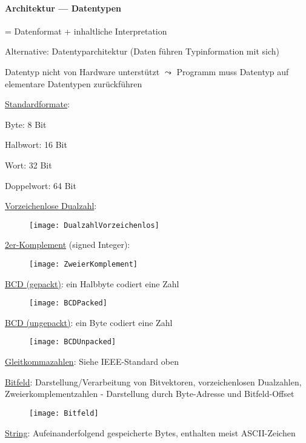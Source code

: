 \paragraph{Architektur --- Datentypen}
\begin{items}
	\item = Datenformat + inhaltliche Interpretation
	\item Alternative: Datentyparchitektur (Daten führen Typinformation mit sich)
	\item Datentyp nicht von Hardware unterstützt $\leadsto$ Programm muss Datentyp auf elementare Datentypen zurückführen
	\item \underline{Standardformate}:
	\begin{enumeration}
		\item Byte: 8 Bit
		\item Halbwort: 16 Bit
		\item Wort: 32 Bit
		\item Doppelwort: 64 Bit
	\end{enumeration}
	\item \underline{Vorzeichenlose Dualzahl}:
	\begin{figure}[H]
	  \centering
	  \texttt{[image: DualzahlVorzeichenlos]}
	  \label{DualzahlVorzeichenlos}
	\end{figure}
	\item \underline{2er-Komplement} (signed Integer):
	\begin{figure}[H]
	  \centering
	  \texttt{[image: ZweierKomplement]}
	  \label{ZweierKomplement}
	\end{figure}
	\newpage
	\item \underline{BCD (gepackt)}: ein Halbbyte codiert eine Zahl
	\begin{figure}[H]
	  \centering
	  \texttt{[image: BCDPacked]}
	  \label{BCDPacked}
	\end{figure}
	\item \underline{BCD (ungepackt)}: ein Byte codiert eine Zahl
	\begin{figure}[H]
	  \centering
	  \texttt{[image: BCDUnpacked]}
	  \label{BCDUnpacked}
	\end{figure}
	\item \underline{Gleitkommazahlen}: Siehe IEEE-Standard oben
	\item \underline{Bitfeld}: Darstellung/Verarbeitung von Bitvektoren, vorzeichenlosen Dualzahlen, Zweierkomplementzahlen - Darstellung durch Byte-Adresse und Bitfeld-Offset
	\begin{figure}[H]
	  \centering
	  \texttt{[image: Bitfeld]}
	  \label{Bitfeld}
	\end{figure}
	\item \underline{String}: Aufeinanderfolgend gespeicherte Bytes, enthalten meist ASCII-Zeichen
\end{items}

